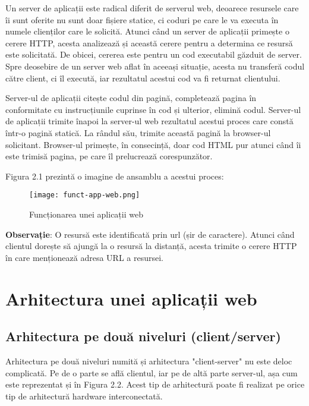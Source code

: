 Un server de aplicații este radical diferit de serverul web, deoarece resursele care îi sunt oferite nu sunt doar fișiere statice, ci coduri pe care le va executa în numele clienților care le solicită. Atunci când un server de aplicații primește o cerere HTTP, acesta analizează și această cerere pentru a determina ce resursă este solicitată. De obicei, cererea este pentru un cod executabil găzduit de server. Spre deosebire de un server web aflat în aceeași situație, acesta nu transferă codul către client, ci îl execută, iar rezultatul acestui cod va fi returnat clientului.\newline

Server-ul de aplicații citește codul din pagină, completează pagina în conformitate cu instrucțiunile cuprinse în cod și ulterior, elimină codul. Server-ul de aplicații trimite înapoi la server-ul web rezultatul acestui proces care constă într-o pagină statică. La rândul său, trimite această pagină la browser-ul solicitant. Browser-ul primește, în consecință, doar cod HTML pur atunci când îi este trimisă pagina, pe care îl prelucrează corespunzător.\newline

Figura 2.1 prezintă o imagine de ansamblu a acestui proces:\newline

\begin{figure}[H]
	\begin{center}
		\texttt{[image: funct-app-web.png]}
		\caption{Funcționarea unei aplicații web}
	\end{center}
\end{figure}

\textbf{Observație}: O resursă este identificată prin url (șir de caractere). Atunci când clientul dorește să ajungă la o resursă la distanță, acesta trimite o cerere HTTP în care menționează adresa URL a resursei.
\newline
\section{Arhitectura unei aplicații web}
\subsection{Arhitectura pe două niveluri (client/server)}
Arhitectura pe două niveluri numită și arhitectura "client-server" nu este deloc complicată. Pe de o parte se află clientul, iar pe de altă parte server-ul, așa cum este reprezentat și în Figura 2.2. Acest tip de arhitectură poate fi realizat pe orice tip de arhitectură hardware interconectată.

